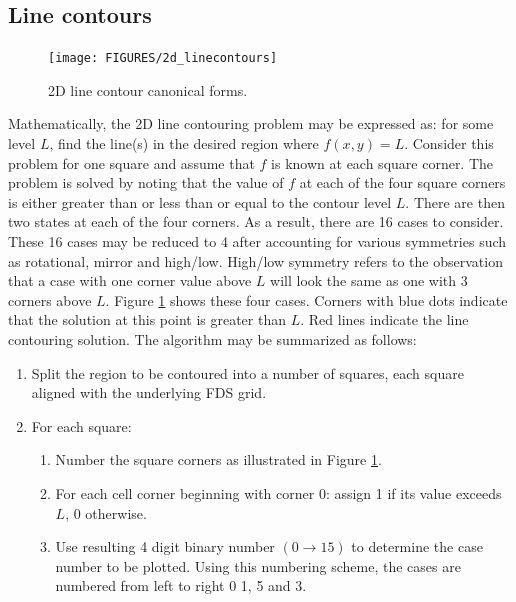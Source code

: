 \documentclass[11pt,twoside]{book}
\begin{document}
\subsection{Line contours}
\begin{figure}[\figoptions]
\begin{center}
\texttt{[image: FIGURES/2d\_linecontours]}
\end{center}
\caption{2D line contour canonical forms.
  }
\label{fig2dline}%
\end{figure}
Mathematically, the 2D line contouring problem may be expressed as: for some level $L$, find the line(s) in the desired region where $f(x,y)=L$.  Consider this problem for one square and assume that $f$ is known at each square corner.  The problem is solved by noting that the value of $f$ at each of the four square corners is either greater than or less than or equal to the contour level $L$.  There are then two states at each of the four corners.  As a result, there are 16 cases to consider.  These 16 cases may be reduced to 4 after accounting for various symmetries such as rotational, mirror and high/low.  High/low symmetry refers to the observation that a case with one corner value above $L$ will look the same as one with 3 corners above $L$.
Figure \ref{fig2dline} shows these four cases.  Corners with blue dots indicate that the solution at this point is greater than $L$.  Red lines indicate the line contouring solution.  The algorithm may be summarized as follows:
\begin{enumerate}
\item Split the region to be contoured into a number of squares, each square aligned with the underlying FDS grid.
\item For  each square:
\begin{enumerate}
\item Number the square corners as illustrated in Figure \ref{fig2dline}.
\item For each cell corner beginning with corner 0: assign 1 if its value exceeds $L$, 0 otherwise.
\item Use resulting 4 digit binary number $(0\rightarrow 15)$ to determine the case number to be plotted.  Using this numbering scheme, the cases are numbered from left to right 0 1, 5 and 3.
\end{enumerate}
\end{enumerate}
\end{document}
